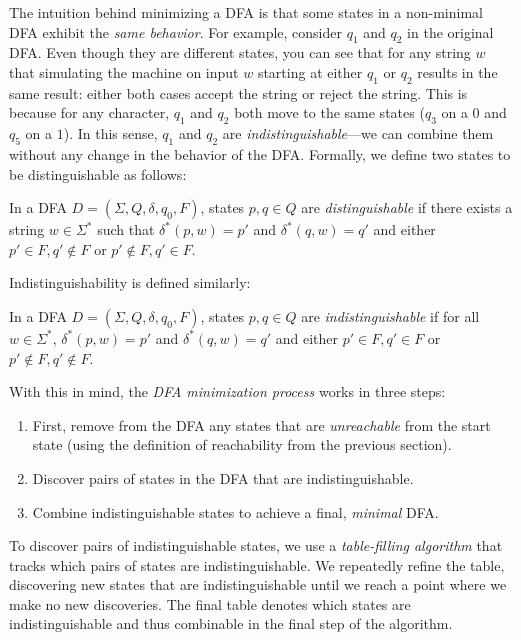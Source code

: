 \documentclass[11pt]{book}
\begin{document}
The intuition behind minimizing a DFA is that some states in a non-minimal DFA exhibit the \emph{same behavior}.
For example, consider $q_1$ and $q_2$ in the original DFA.
Even though they are different states, you can see that for any string $w$ that simulating the machine on input $w$ starting at either $q_1$ or $q_2$ results in the same result: either both cases accept the string or reject the string.
This is because for any character, $q_1$ and $q_2$ both move to the same states ($q_3$ on a $0$ and $q_5$ on a $1$).
In this sense, $q_1$ and $q_2$ are \emph{indistinguishable}---we can combine them without any change in the behavior of the DFA.
Formally, we define two states to be distinguishable as follows:
\begin{defn}
  In a DFA $D = (\Sigma, Q, \delta, q_0, F)$, states $p, q \in Q$ are \emph{distinguishable} if there exists a string $w \in \Sigma^*$ such that $\delta^*(p, w) = p'$ and $\delta^*(q, w) = q'$ and either $p' \in F, q' \not\in F$ or $p' \not\in F, q' \in F$.
\end{defn}
Indistinguishability is defined similarly:
\begin{defn}
  In a DFA $D = (\Sigma, Q, \delta, q_0, F)$, states $p, q \in Q$ are \emph{indistinguishable} if for all $w \in \Sigma^*$, $\delta^*(p, w) = p'$ and $\delta^*(q, w) = q'$ and either $p' \in F, q' \in F$ or $p' \not\in F, q' \not\in F$.
\end{defn}

With this in mind, the \emph{DFA minimization process} works in three steps:

\begin{enumerate}[itemsep=0pt]
  \item First, remove from the DFA any states that are \emph{unreachable} from the start state (using the definition of reachability from the previous section).
  \item Discover pairs of states in the DFA that are indistinguishable.
  \item Combine indistinguishable states to achieve a final, \emph{minimal} DFA.
\end{enumerate}

To discover pairs of indistinguishable states, we use a \emph{table-filling algorithm} that tracks which pairs of states are indistinguishable.
We repeatedly refine the table, discovering new states that are indistinguishable until we reach a point where we make no new discoveries.
The final table denotes which states are indistinguishable and thus combinable in the final step of the algorithm.
\end{document}
